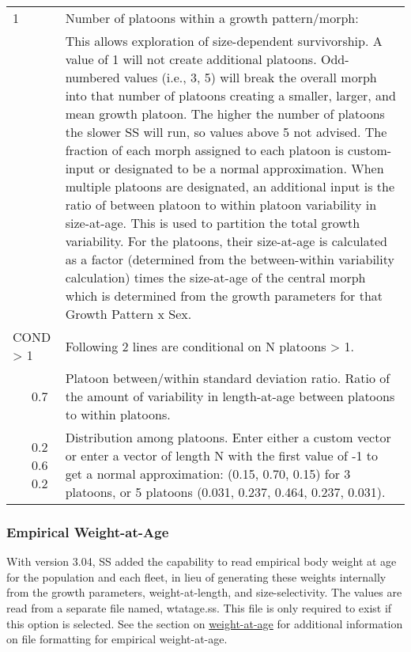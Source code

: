 \begin{center}
\begin{longtable}{p{0.5cm} p{2cm} p{12cm}}
		\hline
		1 & & Number of platoons within a growth pattern/morph:\Tstrut\\
		& & This allows exploration of size-dependent survivorship. A value of 1 will not create additional platoons.  Odd-numbered values (i.e., 3, 5) will break the overall morph into that number of platoons creating a smaller, larger, and mean growth platoon.  The higher the number of platoons the slower SS will run, so values above 5 not advised.  The fraction of each morph assigned to each platoon is custom-input or designated to be a normal approximation.  When multiple platoons are designated, an additional input is the ratio of between platoon to within platoon variability in size-at-age.  This is used to partition the total growth variability.  For the platoons, their size-at-age is calculated as a factor (determined from the between-within variability calculation) times the size-at-age of the central morph which is determined from the growth parameters for that Growth Pattern x Sex. \Bstrut\\

		\multicolumn{2}{l}{COND > 1}& \multicolumn{1}{l}{\parbox{12cm}{Following 2 lines are conditional on N platoons > 1.}} \Tstrut\Bstrut\\

		& 0.7 & Platoon between/within standard deviation ratio. Ratio of the amount of variability in length-at-age between platoons to within platoons.\Bstrut\\

		& 0.2 0.6 0.2 & Distribution among platoons. Enter either a custom vector or enter a vector of length N with the first value of -1 to get a normal approximation: (0.15, 0.70, 0.15) for 3 platoons, or 5 platoons (0.031, 0.237, 0.464, 0.237, 0.031).\Bstrut\\
		\hline
	\end{longtable}
\end{center}

\subsubsection{Empirical Weight-at-Age}
With version 3.04, SS added the capability to read empirical body weight at age for the population and each fleet, in lieu of generating these weights internally from the growth parameters, weight-at-length, and size-selectivity. The values are read from a separate file named, wtatage.ss. This file is only required to exist if this option is selected.  See the section on \hyperlink{WAA}{weight-at-age} for additional information on file formatting for empirical weight-at-age.

